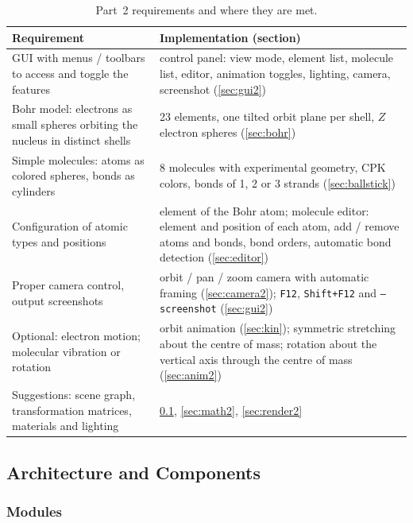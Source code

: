 \documentclass[a4paper, 11pt]{article}
\newcommand{\code}[1]{\texttt{#1}}
\begin{document}
\begin{table}[H]
\centering\small
\begin{tabularx}{\textwidth}{@{}>{\raggedright\arraybackslash}p{5.6cm}X@{}}
\toprule
\textbf{Requirement} & \textbf{Implementation (section)}\\
\midrule
GUI with menus / toolbars to access and toggle the features
  & control panel: view mode, element list, molecule list, editor, animation toggles, lighting, camera, screenshot (\ref{sec:gui2})\\
Bohr model: electrons as small spheres orbiting the nucleus in distinct shells
  & 23 elements, one tilted orbit plane per shell, $Z$ electron spheres (\ref{sec:bohr})\\
Simple molecules: atoms as colored spheres, bonds as cylinders
  & 8 molecules with experimental geometry, CPK colors, bonds of 1, 2 or 3 strands (\ref{sec:ballstick})\\
Configuration of atomic types and positions
  & element of the Bohr atom; molecule editor: element and position of each atom, add / remove atoms and bonds, bond orders,
    automatic bond detection (\ref{sec:editor})\\
Proper camera control, output screenshots
  & orbit / pan / zoom camera with automatic framing (\ref{sec:camera2}); \code{F12}, \code{Shift+F12} and \code{--screenshot} (\ref{sec:gui2})\\
Optional: electron motion; molecular vibration or rotation
  & orbit animation (\ref{sec:kin}); symmetric stretching about the centre of mass; rotation about the vertical axis through the
    centre of mass (\ref{sec:anim2})\\
Suggestions: scene graph, transformation matrices, materials and lighting
  & \ref{sec:arch2}, \ref{sec:math2}, \ref{sec:render2}\\
\bottomrule
\end{tabularx}
\caption{Part~2 requirements and where they are met.}
\label{tab:req2}
\end{table}

\subsection{Architecture and Components}\label{sec:arch2}

\subsubsection{Modules}
\end{document}
